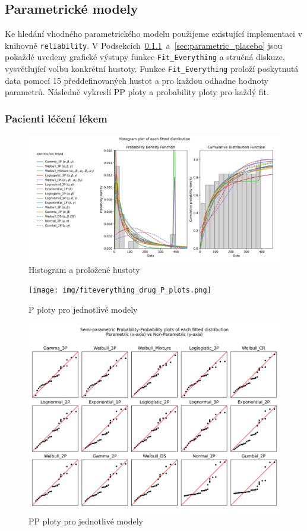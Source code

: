 \documentclass[a4, 11pt]{article}
\theoremstyle{definition}
\theoremstyle{remark}
\begin{document}
	
	\subsection{Parametrické modely} \label{sec:parametric_all}
	Ke hledání vhodného parametrického modelu použijeme existující implementaci v knihovně \texttt{reliability}. 
	V Podsekcích~\ref{sec:parametric_drugs}~a~\ref{sec:parametric_placebo} jsou pokaždé uvedeny grafické výstupy funkce \texttt{Fit\_Everything} a stručná diskuze, vysvětlující volbu konkrétní hustoty.
	Funkce \texttt{Fit\_Everything} proloží poskytnutá data pomocí 15 předdefinovaných hustot a pro každou odhadne hodnoty parametrů. Následně vykreslí PP ploty a probability ploty pro každý fit.
	
	
	\subsubsection{Pacienti léčení lékem} \label{sec:parametric_drugs}
	
	\begin{figure}[H]
		\centering
		\includegraphics[width=0.9\linewidth]{img/fiteverything_drugs_histogram.png}
		\caption{Histogram a proložené hustoty}
		\label{fig:fit_everything_hist_drugs}
	\end{figure}

	\begin{figure}[H]
		\centering
		\texttt{[image: img/fiteverything\_drug\_P\_plots.png]}
		\caption{P ploty pro jednotlivé modely}
		\label{fig:fit_everything_drug_P_plots}
	\end{figure}
	
	\begin{figure}[H]
		\centering
		\includegraphics[width=0.8\linewidth]{img/fiteverything_drug_PP_plots.png}
		\caption{PP ploty pro jednotlivé modely}
		\label{fig:fit_everything_drug_PP_plots}
	\end{figure}
	
\end{document}
